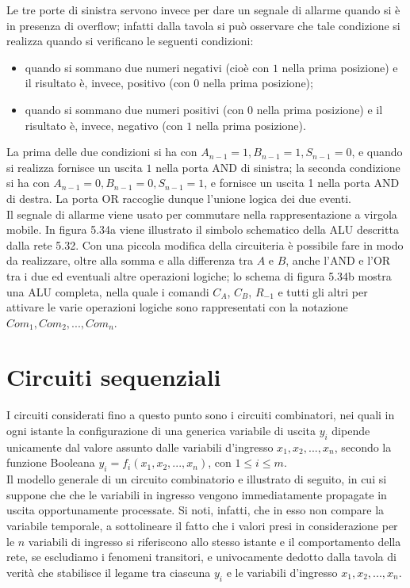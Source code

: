 \documentclass[a4paper]{extarticle}
\begin{document}
\vspace{1em}
\noindent
Le tre porte di sinistra servono invece per dare un segnale di allarme quando si è in presenza di overflow; infatti dalla tavola si può osservare che tale condizione si realizza quando si verificano le seguenti condizioni:
\begin{itemize}
    \item quando si sommano due numeri negativi (cioè con \(1\) nella prima posizione) e il risultato è, invece, positivo (con \(0\) nella prima posizione);
    \item quando si sommano due numeri positivi (con \(0\) nella prima posizione) e il risultato è, invece, negativo (con \(1\) nella prima posizione).
\end{itemize}
La prima delle due condizioni si ha con \(A_{n - 1} = 1, B_{n - 1} = 1, S_{n - 1} = 0\), e quando si realizza fornisce un uscita \(1\) nella porta AND di sinistra; la seconda condizione si ha con \(A_{n - 1} = 0, B_{n - 1} = 0, S_{n - 1} = 1\), e fornisce un uscita 1 nella porta AND di destra. La porta OR raccoglie dunque l’unione logica dei due eventi.\\
Il segnale di allarme viene usato per commutare nella rappresentazione a virgola mobile. In figura 5.34a viene illustrato il simbolo schematico della ALU descritta dalla rete 5.32. Con una piccola modifica della circuiteria è possibile fare in modo da realizzare, oltre alla somma e alla differenza tra \(A\) e \(B\), anche l’AND e l’OR tra i due ed eventuali altre operazioni logiche; lo schema di figura 5.34b mostra una ALU completa, nella quale i comandi \(C_A\), \(C_B\), \(R_{-1}\) e tutti gli altri per attivare le varie operazioni logiche sono rappresentati con la notazione \(Com_1, Com_2, ..., Com_n\).

\newpage
\section{Circuiti sequenziali}
I circuiti considerati fino a questo punto sono i circuiti combinatori, nei quali in ogni istante la configurazione di una generica variabile di uscita \(y_i\) dipende unicamente dal valore assunto dalle variabili d’ingresso \(x_1, x_2, ..., x_n\), secondo la funzione Booleana \(y_i = f_i(x_1, x_2, ..., x_n)\), con \(1 \leq i \leq m\).\\
Il modello generale di un circuito combinatorio e illustrato di seguito, in cui si suppone che che le variabili in ingresso vengono immediatamente propagate in uscita opportunamente processate. Si noti, infatti, che in esso non compare la variabile temporale, a sottolineare il fatto che i valori presi in considerazione per le \(n\) variabili di ingresso si riferiscono allo stesso istante e il comportamento della rete, se escludiamo i fenomeni transitori, e univocamente dedotto dalla tavola di verità che stabilisce il legame tra ciascuna \(y_i\) e le variabili d’ingresso \(x_1, x_2, ..., x_n\).
\end{document}
